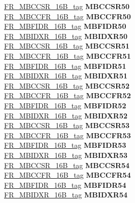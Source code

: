 \begin{DoxyCompactItemize}
\begin{tabbing}
\>\>\mbox{\hyperlink{unionFR__MBCCSR__16B__tag}{FR\_MBCCSR\_16B\_tag}} {\bfseries MBCCSR50}\\
\>\>\mbox{\hyperlink{unionFR__MBCCFR__16B__tag}{FR\_MBCCFR\_16B\_tag}} {\bfseries MBCCFR50}\\
\>\>\mbox{\hyperlink{unionFR__MBFIDR__16B__tag}{FR\_MBFIDR\_16B\_tag}} {\bfseries MBFIDR50}\\
\>\>\mbox{\hyperlink{unionFR__MBIDXR__16B__tag}{FR\_MBIDXR\_16B\_tag}} {\bfseries MBIDXR50}\\
\>\>\mbox{\hyperlink{unionFR__MBCCSR__16B__tag}{FR\_MBCCSR\_16B\_tag}} {\bfseries MBCCSR51}\\
\>\>\mbox{\hyperlink{unionFR__MBCCFR__16B__tag}{FR\_MBCCFR\_16B\_tag}} {\bfseries MBCCFR51}\\
\>\>\mbox{\hyperlink{unionFR__MBFIDR__16B__tag}{FR\_MBFIDR\_16B\_tag}} {\bfseries MBFIDR51}\\
\>\>\mbox{\hyperlink{unionFR__MBIDXR__16B__tag}{FR\_MBIDXR\_16B\_tag}} {\bfseries MBIDXR51}\\
\>\>\mbox{\hyperlink{unionFR__MBCCSR__16B__tag}{FR\_MBCCSR\_16B\_tag}} {\bfseries MBCCSR52}\\
\>\>\mbox{\hyperlink{unionFR__MBCCFR__16B__tag}{FR\_MBCCFR\_16B\_tag}} {\bfseries MBCCFR52}\\
\>\>\mbox{\hyperlink{unionFR__MBFIDR__16B__tag}{FR\_MBFIDR\_16B\_tag}} {\bfseries MBFIDR52}\\
\>\>\mbox{\hyperlink{unionFR__MBIDXR__16B__tag}{FR\_MBIDXR\_16B\_tag}} {\bfseries MBIDXR52}\\
\>\>\mbox{\hyperlink{unionFR__MBCCSR__16B__tag}{FR\_MBCCSR\_16B\_tag}} {\bfseries MBCCSR53}\\
\>\>\mbox{\hyperlink{unionFR__MBCCFR__16B__tag}{FR\_MBCCFR\_16B\_tag}} {\bfseries MBCCFR53}\\
\>\>\mbox{\hyperlink{unionFR__MBFIDR__16B__tag}{FR\_MBFIDR\_16B\_tag}} {\bfseries MBFIDR53}\\
\>\>\mbox{\hyperlink{unionFR__MBIDXR__16B__tag}{FR\_MBIDXR\_16B\_tag}} {\bfseries MBIDXR53}\\
\>\>\mbox{\hyperlink{unionFR__MBCCSR__16B__tag}{FR\_MBCCSR\_16B\_tag}} {\bfseries MBCCSR54}\\
\>\>\mbox{\hyperlink{unionFR__MBCCFR__16B__tag}{FR\_MBCCFR\_16B\_tag}} {\bfseries MBCCFR54}\\
\>\>\mbox{\hyperlink{unionFR__MBFIDR__16B__tag}{FR\_MBFIDR\_16B\_tag}} {\bfseries MBFIDR54}\\
\>\>\mbox{\hyperlink{unionFR__MBIDXR__16B__tag}{FR\_MBIDXR\_16B\_tag}} {\bfseries MBIDXR54}\\

\end{tabbing}
\end{DoxyCompactItemize}
